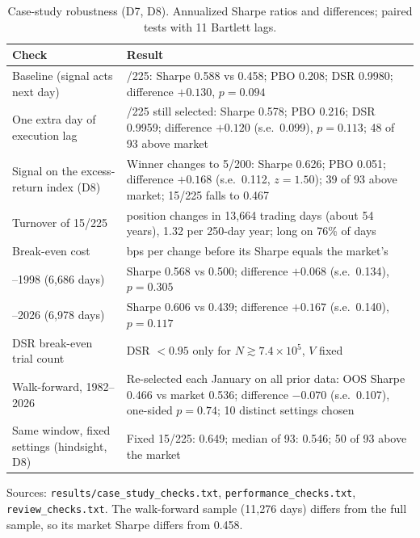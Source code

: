 \documentclass[11pt,a4paper]{article}
\begin{document}
\begin{table}[htbp]
\centering\small
\begin{threeparttable}
\caption{Case-study robustness (D7, D8). Annualized Sharpe ratios and differences; paired tests with 11 Bartlett lags.}\label{tab:robust}
\begin{tabularx}{\textwidth}{@{}>{\raggedright\arraybackslash}p{4.3cm}>{\raggedright\arraybackslash}X@{}}
\toprule
Check & Result \\
\midrule
Baseline (signal acts next day) & 15/225: Sharpe 0.588 vs 0.458; PBO 0.208; DSR 0.9980; difference $+0.130$, $p=0.094$ \\
One extra day of execution lag & 15/225 still selected: Sharpe 0.578; PBO 0.216; DSR 0.9959; difference $+0.120$ (s.e.\ 0.099), $p=0.113$; 48 of 93 above market \\
Signal on the excess-return index (D8) & Winner changes to 5/200: Sharpe 0.626; PBO 0.051; difference $+0.168$ (s.e.\ 0.112, $z=1.50$); 39 of 93 above market; 15/225 falls to 0.467 \\
Turnover of 15/225 & 72 position changes in 13,664 trading days (about 54 years), 1.32 per 250-day year; long on 76\% of days \\
Break-even cost & 121 bps per change before its Sharpe equals the market's \\
1972--1998 (6,686 days) & Sharpe 0.568 vs 0.500; difference $+0.068$ (s.e.\ 0.134), $p=0.305$ \\
1999--2026 (6,978 days) & Sharpe 0.606 vs 0.439; difference $+0.167$ (s.e.\ 0.140), $p=0.117$ \\
DSR break-even trial count & DSR $<0.95$ only for $N\gtrsim7.4\times10^5$, $V$ fixed \\
Walk-forward, 1982--2026 & Re-selected each January on all prior data: OOS Sharpe 0.466 vs market 0.536; difference $-0.070$ (s.e.\ 0.107), one-sided $p=0.74$; 10 distinct settings chosen \\
Same window, fixed settings (hindsight, D8) & Fixed 15/225: 0.649; median of 93: 0.546; 50 of 93 above the market \\
\bottomrule
\end{tabularx}
\begin{tablenotes}\footnotesize
\item Sources: \texttt{results/case\_study\_checks.txt}, \texttt{performance\_checks.txt}, \texttt{review\_checks.txt}. The walk-forward sample (11,276 days) differs from the full sample, so its market Sharpe differs from 0.458.
\end{tablenotes}
\end{threeparttable}
\end{table}
\end{document}

